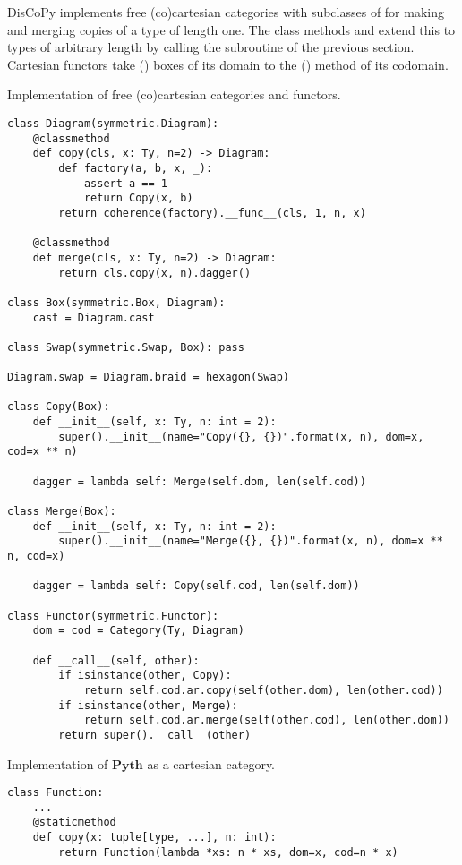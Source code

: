 DisCoPy implements free (co)cartesian categories with subclasses of  for making and merging  copies of a type  of length one.
The class methods  and  extend this to types of arbitrary length by calling the  subroutine of the previous section.
Cartesian functors take  () boxes of its domain to the  () method of its codomain.

\begin{python}
{\normalfont Implementation of free (co)cartesian categories and functors.}

\begin{verbatim}
class Diagram(symmetric.Diagram):
    @classmethod
    def copy(cls, x: Ty, n=2) -> Diagram:
        def factory(a, b, x, _):
            assert a == 1
            return Copy(x, b)
        return coherence(factory).__func__(cls, 1, n, x)

    @classmethod
    def merge(cls, x: Ty, n=2) -> Diagram:
        return cls.copy(x, n).dagger()

class Box(symmetric.Box, Diagram):
    cast = Diagram.cast

class Swap(symmetric.Swap, Box): pass

Diagram.swap = Diagram.braid = hexagon(Swap)

class Copy(Box):
    def __init__(self, x: Ty, n: int = 2):
        super().__init__(name="Copy({}, {})".format(x, n), dom=x, cod=x ** n)

    dagger = lambda self: Merge(self.dom, len(self.cod))

class Merge(Box):
    def __init__(self, x: Ty, n: int = 2):
        super().__init__(name="Merge({}, {})".format(x, n), dom=x ** n, cod=x)

    dagger = lambda self: Copy(self.cod, len(self.dom))

class Functor(symmetric.Functor):
    dom = cod = Category(Ty, Diagram)

    def __call__(self, other):
        if isinstance(other, Copy):
            return self.cod.ar.copy(self(other.dom), len(other.cod))
        if isinstance(other, Merge):
            return self.cod.ar.merge(self(other.cod), len(other.dom))
        return super().__call__(other)
\end{verbatim}
\end{python}

\begin{python}\label{listing:python-co-cartesian}
{\normalfont Implementation of $\mathbf{Pyth}$ as a cartesian category.}

\begin{verbatim}
class Function:
    ...
    @staticmethod
    def copy(x: tuple[type, ...], n: int):
        return Function(lambda *xs: n * xs, dom=x, cod=n * x)
\end{verbatim}
\end{python}

